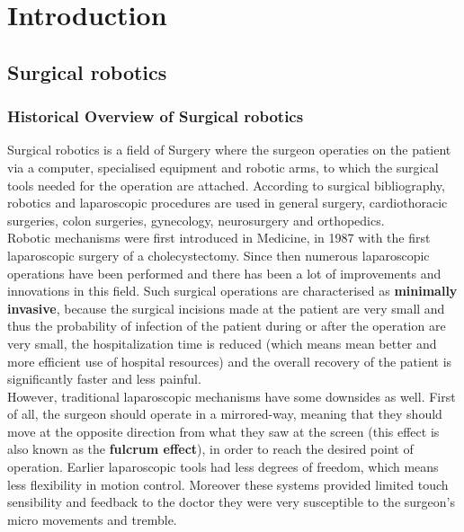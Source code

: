 \chapter{Introduction}

\section{Surgical robotics}

\subsection{Historical Overview of Surgical robotics}

Surgical robotics is a field of Surgery where the surgeon operaties on the patient via a computer, specialised equipment and robotic arms, 
to which the surgical tools needed for the operation are attached. According to surgical bibliography, robotics and laparoscopic procedures are used 
in general surgery, cardiothoracic surgeries, colon surgeries, gynecology, neurosurgery and orthopedics. \\

Robotic mechanisms were first introduced in Medicine, in 1987 with the first laparoscopic surgery of a cholecystectomy. Since then numerous laparoscopic 
operations have been performed and there has been a lot of improvements and innovations in this field. Such surgical operations are characterised as 
\textbf{minimally invasive}, because the surgical incisions made at the patient are very small and thus the probability of infection of the patient during 
or after the operation are very small, the hospitalization time is reduced (which means mean better and more efficient use of hospital resources) and the overall 
recovery of the patient is significantly faster and less painful. \\

However, traditional laparoscopic mechanisms have some downsides as well. First of all, the surgeon should operate in a mirrored-way, meaning that they should 
move at the opposite direction from what they saw at the screen (this effect is also known as the \textbf{fulcrum effect}), in order to reach the desired point of operation. Earlier laparoscopic tools had less 
degrees of freedom, which means less flexibility in motion control. Moreover these systems provided limited touch sensibility and feedback to the doctor they 
were very susceptible to the surgeon's micro movements and tremble. \\

